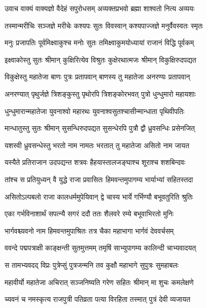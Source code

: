 \twolineshloka
{उवाच वाक्यं वाक्यज्ञो वैदेहं सपुरोधसम्}
{अव्यक्तप्रभवो ब्रह्मा शाश्वतो नित्य अव्ययः} %

\twolineshloka
{तस्मान्मरीचिः सञ्जज्ञे मरीचेः कश्यपः सुतः}
{विवस्वान् कश्यपाज्जज्ञे मनुर्वैवस्वतः स्मृतः} %

\twolineshloka
{मनुः प्रजापतिः पूर्वमिक्ष्वाकुश्च मनोः सुतः}
{तमिक्ष्वाकुमयोध्यायां राजानं विद्धि पूर्वकम्} %

\twolineshloka
{इक्ष्वाकोस्तु सुतः श्रीमान् कुक्षिरित्येव विश्रुतः}
{कुक्षेरथात्मजः श्रीमान् विकुक्षिरुदपद्यत} %

\twolineshloka
{विकुक्षेस्तु महातेजा बाणः पुत्रः प्रतापवान्}
{बाणस्य तु महातेजा अनरण्यः प्रतापवान्} %

\twolineshloka
{अनरण्यात् पृथुर्जज्ञे त्रिशङ्कुस्तु पृथोरपि}
{त्रिशङ्कोरभवत् पुत्रो धुन्धुमारो महायशाः} %

\twolineshloka
{धुन्धुमारान्महातेजा युवनाश्वो महारथः}
{युवनाश्वसुतश्चासीन्मान्धाता पृथिवीपतिः} %

\twolineshloka
{मान्धातुस्तु सुतः श्रीमान् सुसन्धिरुदपद्यत}
{सुसन्धेरपि पुत्रौ द्वौ ध्रुवसन्धिः प्रसेनजित्} %

\twolineshloka
{यशस्वी ध्रुवसन्धेस्तु भरतो नाम नामतः}
{भरतात् तु महातेजा असितो नाम जायत} %

\twolineshloka
{यस्यैते प्रतिराजान उदपद्यन्त शत्रवः}
{हैहयास्तालजङ्घाश्च शूराश्च शशबिन्दवः} %

\twolineshloka
{तांश्च स प्रतियुध्यन् वै युद्धे राजा प्रवासितः}
{हिमवन्तमुपागम्य भार्याभ्यां सहितस्तदा} %

\twolineshloka
{असितोऽल्पबलो राजा कालधर्ममुपेयिवान्}
{द्वे चास्य भार्ये गर्भिण्यौ बभूवतुरिति श्रुतिः} %

\twolineshloka
{एका गर्भविनाशार्थं सपत्न्यै सगरं ददौ}
{ततः शैलवरे रम्ये बभूवाभिरतो मुनिः} %

\twolineshloka
{भार्गवश्च्यवनो नाम हिमवन्तमुपाश्रितः}
{तत्र चैका महाभागा भार्गवं देववर्चसम्} %

\twolineshloka
{ववन्दे पद्मपत्राक्षी काङ्क्षन्ती सुतमुत्तमम्}
{तमृषिं साभ्युपागम्य कालिन्दी चाभ्यवादयत्} %

\twolineshloka
{स तामभ्यवदद् विप्रः पुत्रेप्सुं पुत्रजन्मनि}
{तव कुक्षौ महाभागे सुपुत्रः सुमहाबलः} %

\twolineshloka
{महावीर्यो महातेजा अचिरात् सञ्जनिष्यति}
{गरेण सहितः श्रीमान् मा शुचः कमलेक्षणे} %

\twolineshloka
{च्यवनं च नमस्कृत्य राजपुत्री पतिव्रता}
{पत्या विरहिता तस्मात् पुत्रं देवी व्यजायत} %

